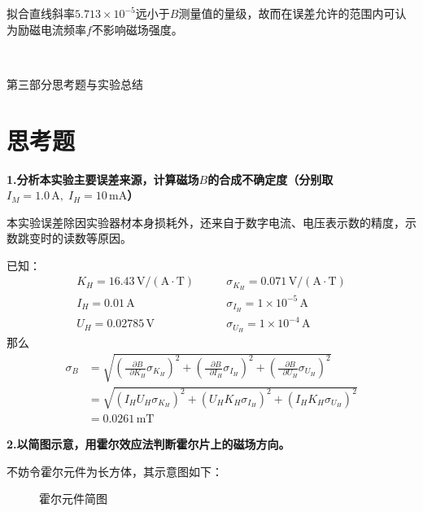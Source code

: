 \documentclass[UTF-8,twoside,cs4size]{ctexart}
\newcommand*{\mpar}{\mathop{}\!\partial}
\begin{document}
	拟合直线斜率$ 5.713\times10^{-5} $远小于$ B $测量值的量级，故而在误差允许的范围内可认为励磁电流频率$ f $不影响磁场强度。
	
	\newpage
	
	~\
	
	\begin{center}
		\Large\heiti 第三部分\quad 思考题与实验总结
	\end{center}
	\setcounter{section}{0}
	
	\section{思考题}
	\textbf{1.分析本实验主要误差来源，计算磁场$ B $的合成不确定度（分别取$ I_M=1.0\,\mathrm A,\;I_H=10\,\mathrm{mA} $）}
	
	{\kaishu 本实验误差除因实验器材本身损耗外，还来自于数字电流、电压表示数的精度，示数跳变时的读数等原因。
	
	已知：
	\begin{align*}
		K_H=16.43\,\mathrm{V/(A\cdot T)}\quad & \quad\sigma_{K_H}=0.071\,\mathrm{V/(A\cdot T)}\\
		I_H=0.01\,\mathrm{A}\quad & \quad\sigma_{I_H}=1\times10^{-5}\,\mathrm{A}\\
		U_H=0.02785\,\mathrm{V}\quad & \quad\sigma_{U_H}=1\times10^{-4}\,\mathrm A
	\end{align*}
	那么
	\begin{align*}
		\sigma_B & =\sqrt{\left(\frac{\mpar B}{\mpar K_H}\sigma_{K_H}\right)^2+\left(\frac{\mpar B}{\mpar I_H}\sigma_{I_H}\right)^2+\left(\frac{\mpar B}{\mpar U_H}\sigma_{U_H}\right)^2}\\
		& =\sqrt{(I_HU_H\sigma_{K_H})^2+(U_HK_H\sigma_{I_H})^2+(I_HK_H\sigma_{U_H})^2}\\
		& =0.0261\,\mathrm{mT}
\end{align*}}

	\textbf{2.以简图示意，用霍尔效应法判断霍尔片上的磁场方向。}
	
	{\kaishu 不妨令霍尔元件为长方体，其示意图如下：}
	\begin{figure}[!h]
		\centering
		\caption{霍尔元件简图}
	\end{figure}
	
\end{document}
